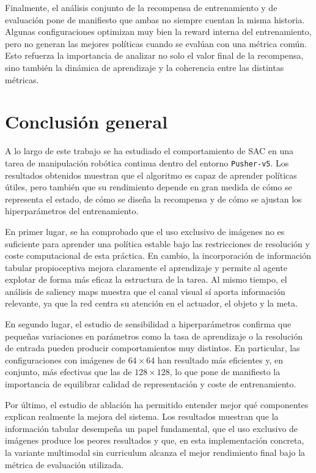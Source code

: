 \documentclass[10pt,twocolumn]{article}
\begin{document}
Finalmente, el análisis conjunto de la recompensa de entrenamiento y de evaluación pone de manifiesto que ambas no siempre cuentan la misma historia. Algunas configuraciones optimizan muy bien la reward interna del entrenamiento, pero no generan las mejores políticas cuando se evalúan con una métrica común. Esto refuerza la importancia de analizar no solo el valor final de la recompensa, sino también la dinámica de aprendizaje y la coherencia entre las distintas métricas.

\section{Conclusión general}

A lo largo de este trabajo se ha estudiado el comportamiento de SAC en una tarea de manipulación robótica continua dentro del entorno \texttt{Pusher-v5}. Los resultados obtenidos muestran que el algoritmo es capaz de aprender políticas útiles, pero también que su rendimiento depende en gran medida de cómo se representa el estado, de cómo se diseña la recompensa y de cómo se ajustan los hiperparámetros del entrenamiento.

En primer lugar, se ha comprobado que el uso exclusivo de imágenes no es suficiente para aprender una política estable bajo las restricciones de resolución y coste computacional de esta práctica. En cambio, la incorporación de información tabular propioceptiva mejora claramente el aprendizaje y permite al agente explotar de forma más eficaz la estructura de la tarea. Al mismo tiempo, el análisis de saliency maps muestra que el canal visual sí aporta información relevante, ya que la red centra su atención en el actuador, el objeto y la meta.

En segundo lugar, el estudio de sensibilidad a hiperparámetros confirma que pequeñas variaciones en parámetros como la tasa de aprendizaje o la resolución de entrada pueden producir comportamientos muy distintos. En particular, las configuraciones con imágenes de \(64\times64\) han resultado más eficientes y, en conjunto, más efectivas que las de \(128\times128\), lo que pone de manifiesto la importancia de equilibrar calidad de representación y coste de entrenamiento.

Por último, el estudio de ablación ha permitido entender mejor qué componentes explican realmente la mejora del sistema. Los resultados muestran que la información tabular desempeña un papel fundamental, que el uso exclusivo de imágenes produce los peores resultados y que, en esta implementación concreta, la variante multimodal sin curriculum alcanza el mejor rendimiento final bajo la métrica de evaluación utilizada.
\end{document}
